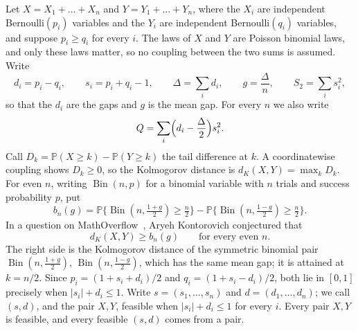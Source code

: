 \documentclass[11pt,a4paper]{article}
\numberwithin{equation}{section}
\theoremstyle{remark}
\newcommand{\Pp}{\mathbb P}
\newcommand{\Bin}{\operatorname{Bin}}
\begin{document}
Let $X=X_1+\dots+X_n$ and $Y=Y_1+\dots+Y_n$, where the $X_i$ are independent Bernoulli$(p_i)$ variables and the $Y_i$ are independent Bernoulli$(q_i)$ variables, and suppose $p_i\ge q_i$ for every $i$. The laws of $X$ and $Y$ are Poisson binomial laws, and only these laws matter, so no coupling between the two sums is assumed. Write
\[
d_i=p_i-q_i,\qquad s_i=p_i+q_i-1,\qquad \Delta=\sum_i d_i,\qquad g=\frac{\Delta}{n},\qquad S_2=\sum_i s_i^2,
\]
so that the $d_i$ are the gaps and $g$ is the mean gap. For every $n$ we also write
\begin{equation}\label{eq:Qdef}
Q=\sum_i\Bigl(d_i-\frac\Delta2\Bigr)s_i^2 .
\end{equation} Call $D_k=\Pp(X\ge k)-\Pp(Y\ge k)$ the tail difference at $k$. A coordinatewise coupling shows $D_k\ge0$, so the Kolmogorov distance is $d_K(X,Y)=\max_k D_k$. For even $n$, writing $\Bin(n,p)$ for a binomial variable with $n$ trials and success probability $p$, put
\[
b_n(g)=\Pp\{\Bin(n,\tfrac{1+g}2)\ge\tfrac n2\}-\Pp\{\Bin(n,\tfrac{1-g}2)\ge\tfrac n2\}.
\]
In a question on MathOverflow~\cite{Kontorovich}, Aryeh Kontorovich conjectured that
\begin{equation}\label{eq:conj}
d_K(X,Y)\ge b_n(g)\qquad\text{for every even } n.
\end{equation}
The right side is the Kolmogorov distance of the symmetric binomial pair $\Bin(n,\frac{1+g}2)$, $\Bin(n,\frac{1-g}2)$, which has the same mean gap; it is attained at $k=n/2$. Since $p_i=(1+s_i+d_i)/2$ and $q_i=(1+s_i-d_i)/2$, both lie in $[0,1]$ precisely when $|s_i|+d_i\le1$. Write $s=(s_1,\dots,s_n)$ and $d=(d_1,\dots,d_n)$; we call $(s,d)$, and the pair $X,Y$, feasible when $|s_i|+d_i\le1$ for every $i$. Every pair $X,Y$ is feasible, and every feasible $(s,d)$ comes from a pair.
\end{document}
